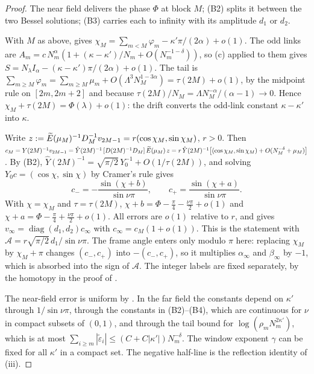 \begin{proof}
The near field delivers the phase $\Phi$ at block $M$; (B2) splits it between the two Bessel
solutions; (B3) carries each to infinity with its amplitude $d_1$ or $d_2$.

 With $M$ as above,  gives
$\chi_M=\sum_{m<M}\varphi_m-\kappa'\pi/(2\alpha)+o(1)$. The odd links are
$A_m=c\,N_m^\alpha(1+(\kappa-\kappa')/N_m+O(N_m^{-1-\delta}))$, so (c) applied
to them gives $S=N_\lambda I_\alpha-(\kappa-\kappa')\pi/(2\alpha)+o(1)$. The tail is
$\sum_{m\ge M}\varphi_m=\sum_{m\ge M}\mu_m+O(\Lambda^3N_M^{1-3\alpha})=\tau(2M)+o(1)$, by the
midpoint rule on $[2m,2m+2]$ and because $\tau(2M)/N_M=\Lambda N_M^{-\alpha}/(\alpha-1)\to0$.
Hence $\chi_M+\tau(2M)=\Phi(\lambda)+o(1)$: the drift converts the odd-link constant
$\kappa-\kappa'$ into $\kappa$.

 Write $z:=\widetilde E(\mu_M)^{-1}D_M^{-1}v_{2M-1}=r(\cos\chi_M,\sin\chi_M)$, $r>0$.
Then
$c_M=Y(2M)^{-1}v_{2M-1}=\hat Y(2M)^{-1}\,[D(2M)^{-1}D_M]\,\widetilde E(\mu_M)\,z
=r\,\hat Y(2M)^{-1}\bigl[(\cos\chi_M,\sin\chi_M)+O(N_M^{-\delta}+\mu_M)\bigr]$. By (B2),
$\hat Y(2M)^{-1}=\sqrt{\pi/2}\,Y_0^{-1}+O(1/\tau(2M))$, and solving
$Y_0c=(\cos\chi,\sin\chi)$ by Cramer's rule gives
\[
  c_-=-\frac{\sin(\chi+b)}{\sin\nu\pi},\qquad c_+=\frac{\sin(\chi+a)}{\sin\nu\pi}.
\]
With $\chi=\chi_M$ and $\tau=\tau(2M)$, $\chi+b=\Phi-\frac\pi4-\frac{\nu\pi}2+o(1)$ and
$\chi+a=\Phi-\frac\pi4+\frac{\nu\pi}2+o(1)$. All errors are $o(1)$ relative to $r$, and
 gives $v_\infty=\operatorname{diag}(d_1,d_2)c_\infty$ with
$c_\infty=c_M(1+o(1))$. This is the statement with
$\mathcal A=r\sqrt{\pi/2}\,d_1/\sin\nu\pi$. The frame angle enters only modulo $\pi$ here: replacing
$\chi_M$ by $\chi_M+\pi$ changes $(c_-,c_+)$ into $-(c_-,c_+)$, so it multiplies $\alpha_\infty$ and
$\beta_\infty$ by $-1$, which is absorbed into the sign of $\mathcal A$. The integer labels are fixed
separately, by the homotopy in the proof of .

 The near-field error is uniform by . In the far
field the constants depend on $\kappa'$ through $1/\sin\nu\pi$, through the constants in
(B2)--(B4), which are continuous for $\nu$ in compact subsets of $(0,1)$, and through the
tail bound for $\log(\rho_mN_m^{2\kappa'})$, which is at most
$\sum_{i\ge m}|\tilde\varepsilon_i|\le(C+C|\kappa'|)N_m^{-\delta}$. The window exponent $\gamma$
can be fixed for all $\kappa'$ in a compact set. The negative half-line is the
reflection identity of (iii).
\end{proof}

